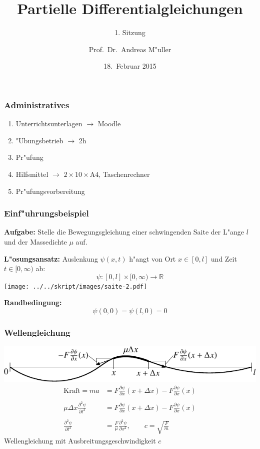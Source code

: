 \documentclass{beamer}
\title[]{Partielle Differentialgleichungen}
\subtitle{1. Sitzung}
\date[18.~Februar 2015]{18.~Februar 2015}
\author{Prof.~Dr.~Andreas M"uller}
\begin{document}
\begin{frame}
\titlepage
\end{frame}

\begin{frame}
\frametitle{Administratives}
\begin{enumerate}
\item Unterrichtsunterlagen $\to$ Moodle
\item "Ubungsbetrieb $\to$ 2h
\item Pr"ufung
\item Hilfsmittel $\to$ $2\times 10\times \text{A4}$, Taschenrechner
\item Pr"ufungsvorbereitung
\end{enumerate}
\end{frame}

\begin{frame}
\frametitle{Einf"uhrungsbeispiel}

{\bf Aufgabe:} Stelle die Bewegungsgleichung
einer schwingenden Saite der L"ange $l$ und der Massedichte $\mu$ auf.

\medskip
\pause
{\bf L"osungsansatz:}
Auslenkung $\psi(x,t)$ h"angt von Ort $x\in[0,l]$ und Zeit $t\in[0,\infty)$
ab:
\[
\psi\colon [0,l]\times [0,\infty)\to \mathbb R
\]
\pause
\medskip
\texttt{[image: ../../skript/images/saite-2.pdf]}
\pause
\medskip

{\bf Randbedingung:}
\[
\psi(0,0)=\psi(l,0)=0
\]
\end{frame}


\begin{frame}
\frametitle{Wellengleichung}
\includegraphics{../../skript/images/saite-1.pdf}
\begin{align*}
\text{Kraft}
=ma
&=
F\frac{\partial\psi}{\partial x}(x+\Delta x)-F\frac{\partial\psi}{\partial x}(x)
\\
\\
\mu \Delta x \frac{\partial^2 \psi}{\partial t^2}
&=
F\frac{\partial\psi}{\partial x}(x+\Delta x)-F\frac{\partial\psi}{\partial x}(x)
\\
\\
\frac{\partial^2 \psi}{\partial t^2}
&=
\frac{F}{\mu}
\frac{\partial^2\psi}{\partial x^2},
\qquad
c=\sqrt{\frac{F}{m}}
\end{align*}
Wellengleichung mit Ausbreitungsgeschwindigkeit $c$
\end{frame}
\end{document}
